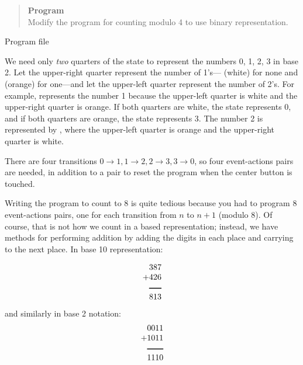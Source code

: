 \begin{quote}
\textbf{Program}\\
Modify the program for counting modulo 4 to use binary representation.
\end{quote}

{\raggedleft \hfill Program file }

We need only \emph{two} quarters of the state to represent the numbers
0, 1, 2, 3 in base 2. Let the upper-right quarter represent the number
of 1's--- (white) for none and  (orange) for one---and let
the upper-left quarter represent the number of 2's. For example,
 represents the number 1 because the upper-left
quarter is white and the upper-right quarter is orange. If both quarters
are white, the state represents 0, and if both quarters are orange, the
state represents 3. The number 2 is represented by ,
where the upper-left quarter is orange and the upper-right quarter is
white.

There are four transitions $0\rightarrow 1, 1\rightarrow 2, 2
\rightarrow 3, 3\rightarrow 0$, so four event-actions pairs are needed,
in addition to a pair to reset the program when the center button is
touched.

\bigskip


\bigskip




Writing the program to count to 8 is quite tedious because you had to
program 8 event-actions pairs, one for each transition from $n$ to $n+1$
(modulo 8). Of course, that is not how we count in a based
representation; instead, we have methods for performing addition by
adding the digits in each place and carrying to the next place. In base
10 representation:

\begin{displaymath}
\begin{array}{r}
387\\
+426\\
\rule[1pt]{1.5em}{1pt}\\
813\\
\end{array}
\end{displaymath}
and similarly in base 2 notation:
\begin{displaymath}
\begin{array}{r}
0011\\
+1011\\
\rule[1pt]{2em}{1pt}\\
1110\\
\end{array}
\end{displaymath}


